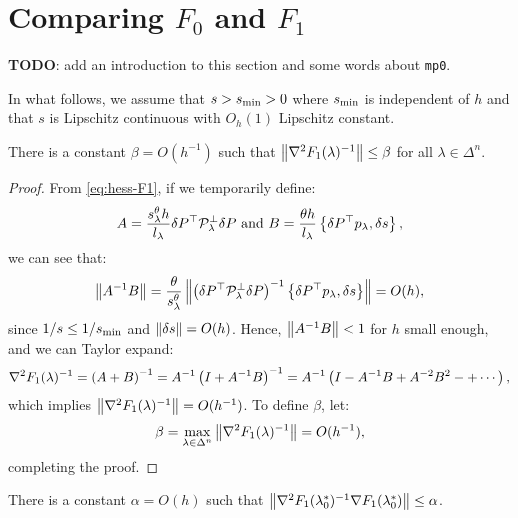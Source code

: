 \documentclass[eikonal.tex]{subfiles}
\begin{document}
\section{Comparing $F_0$ and $F_1$}

\textbf{TODO}: add an introduction to this section and some words
about \texttt{mp0}.

In what follows, we assume that $s > s_{\operatorname{min}} > 0$ where $s_{\operatorname{min}}$ is
independent of $h$ and that $s$ is Lipschitz continuous with $O_h(1)$
Lipschitz constant.

\begin{lemma}\label{lemma:bounded-inv-hess-F1}
  There is a constant $\beta = O(h^{-1})$ such that
  $\left\|\nabla^2 F_1(\lambda)^{-1}\right\| \leq \beta$ for all
  $\lambda \in \Delta^n$.
\end{lemma}

\begin{proof}
  From \cref{eq:hess-F1}, if we temporarily define:
  \begin{equation}
    A = \frac{s^\theta_\lambda h}{l_\lambda} \delta P^\top \mathcal{P}^\perp_\lambda \delta P \mbox{ and } B = \frac{\theta h}{l_\lambda} \left\{\delta P^\top p_\lambda, \delta s\right\},
  \end{equation}
  we can see that:
  \begin{equation}
    \left\|A^{-1} B\right\| = \frac{\theta}{s^\theta_\lambda} \left\|\left(\delta P^\top \mathcal{P}^\perp_\lambda \delta P\right)^{-1} \left\{\delta P^\top p_\lambda, \delta s\right\}\right\| = O(h),
  \end{equation}
  since $1/s \leq 1/s_{\operatorname{min}}$ and $\left\|\delta s\right\| = O(h)$. Hence,
  $\left\|A^{-1} B\right\| < 1$ for $h$ small enough, and we can Taylor
  expand:
  \begin{equation}
    \nabla^2 F_1(\lambda)^{-1} = \left(A + B\right)^{-1} = A^{-1} \left(I + A^{-1}B\right)^{-1} = A^{-1} \left(I - A^{-1} B + A^{-2} B^2 - + \cdots\right),
  \end{equation}
  which implies $\left\|\nabla^2 F_1(\lambda)^{-1}\right\| = O(h^{-1})$. To
  define $\beta$, let:
  \begin{equation}
    \beta = \max_{\lambda \in \Delta^n} \left\|\nabla^2 F_1(\lambda)^{-1}\right\| = O(h^{-1}),
  \end{equation}
  completing the proof.
\end{proof}

\begin{lemma}\label{lemma:bounded-first-step}
  There is a constant $\alpha = O(h)$ such that
  $\left\|\nabla^2 F_1(\lambda_{0}^*)^{-1} \nabla F_1(\lambda_{0}^*)\right\|
  \leq \alpha$.
\end{lemma}
\end{document}
